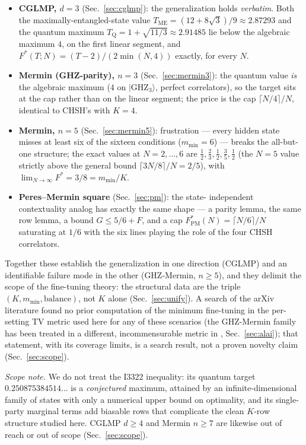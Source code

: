 \documentclass[aps,pra,reprint,superscriptaddress,floatfix]{revtex4-2}
\newcommand{\ket}[1]{\lvert #1\rangle}
\begin{document}
\begin{itemize}
\item \textbf{{CGLMP}, $d=3$} (Sec.~\ref{sec:cglmp}): the generalization
  holds \emph{verbatim}. Both the maximally-entangled-state value
  $T_{\mathrm{ME}}=(12+8\sqrt{3})/9\approx 2.87293$ \cite{cglmp2002} and the
  quantum maximum $T_{\mathrm{Q}}=1+\sqrt{11/3}\approx2.91485$
  \cite{adgl2002,npa2008} lie below the algebraic maximum $4$, on the first linear
  segment, and $F^{*}(T;N)=(T-2)/(2\min(N,4))$ exactly, for every $N$.
\item \textbf{{Mermin} (GHZ-parity), $n=3$} (Sec.~\ref{sec:mermin3}): the
  quantum value \emph{is} the algebraic maximum ($4$ on
  $\ket{\mathrm{GHZ}_{3}}$, perfect correlators), so the target sits at the
  cap rather than on the linear segment; the price is the cap
  $\lceil N/4\rceil/N$, identical to {CHSH}'s with $K=4$.
\item \textbf{{Mermin}, $n=5$} (Sec.~\ref{sec:mermin5}): frustration ---
  every hidden state misses at least six of the sixteen conditions
  ($m_{\min}=6$) --- breaks the all-but-one structure; the exact values at
  $N=2,\dots,6$ are $\tfrac12,\tfrac23,\tfrac12,\tfrac35,\tfrac12$ (the
  $N=5$ value strictly above the general bound $\lceil 3N/8\rceil/N=2/5$),
  with $\lim_{N\to\infty}F^{*}=3/8=m_{\min}/K$.
\item \textbf{Peres--Mermin square} (Sec.~\ref{sec:pm}): the state-
  independent contextuality analog has exactly the same shape --- a parity
  lemma, the same row lemma, a bound $G\le 5/6+F$, and a cap
  $F^{*}_{\mathrm{PM}}(N)=\lceil N/6\rceil/N$ saturating at $1/6$ with the
  six lines playing the role of the four {CHSH} correlators.
\end{itemize}

Together these establish the generalization in one direction ({CGLMP}) and
an identifiable failure mode in the other (GHZ-{Mermin}, $n\ge 5$), and they
delimit the scope of the fine-tuning theory: the structural data are the
triple $(K,m_{\min},\text{balance})$, not $K$ alone
(Sec.~\ref{sec:unify}). A search of the {arXiv} literature found no prior
computation of the minimum fine-tuning in the per-setting TV metric used
here for any of these scenarios (the GHZ-{Mermin} family has been treated
in a different, incommensurable metric in \cite{alai2026b},
Sec.~\ref{sec:alai}); that statement, with its coverage limits, is a search
result, not a proven novelty claim (Sec.~\ref{sec:scope}).

\emph{Scope note.} We do not treat the {I3322} inequality: its quantum
target $0.250875384514\ldots$ is a \emph{conjectured} maximum, attained by
an infinite-dimensional family of states with only a numerical upper bound
on optimality, and its single-party marginal terms add biasable rows that
complicate the clean $K$-row structure studied here. {CGLMP} $d\ge 4$ and
{Mermin} $n\ge 7$ are likewise out of reach or out of scope
(Sec.~\ref{sec:scope}).
\end{document}
